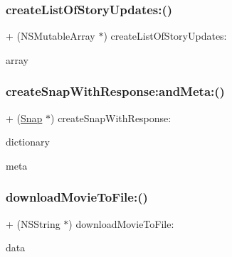 \subsubsection{\texorpdfstring{create\+List\+Of\+Story\+Updates\+:()}{createListOfStoryUpdates:()}}
{\footnotesize\ttfamily + (N\+S\+Mutable\+Array $\ast$) create\+List\+Of\+Story\+Updates\+: \begin{DoxyParamCaption}\item[{(N\+S\+Array $\ast$)}]{array }\end{DoxyParamCaption}}

\hypertarget{interface_get_helper_aa40b94636ae53ee54db9a11c7480fd2b}{}\label{interface_get_helper_aa40b94636ae53ee54db9a11c7480fd2b} 
\subsubsection{\texorpdfstring{create\+Snap\+With\+Response\+:and\+Meta\+:()}{createSnapWithResponse:andMeta:()}}
{\footnotesize\ttfamily + (\hyperlink{interface_snap}{Snap} $\ast$) create\+Snap\+With\+Response\+: \begin{DoxyParamCaption}\item[{(N\+S\+Dictionary $\ast$)}]{dictionary }\item[{andMeta:(N\+S\+Dictionary $\ast$)}]{meta }\end{DoxyParamCaption}}

\hypertarget{interface_get_helper_ad1e95f6ad276d176fb7fb59b0fc1c7a9}{}\label{interface_get_helper_ad1e95f6ad276d176fb7fb59b0fc1c7a9} 
\subsubsection{\texorpdfstring{download\+Movie\+To\+File\+:()}{downloadMovieToFile:()}}
{\footnotesize\ttfamily + (N\+S\+String $\ast$) download\+Movie\+To\+File\+: \begin{DoxyParamCaption}\item[{(N\+S\+Data $\ast$)}]{data }\end{DoxyParamCaption}}

\hypertarget{interface_get_helper_a8b0554dfefdc23e2e9705484153b3f5e}{}\label{interface_get_helper_a8b0554dfefdc23e2e9705484153b3f5e} 
